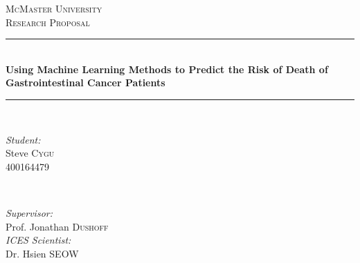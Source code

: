 \begin{titlepage}

\newcommand{\HRule}{\rule{\linewidth}{0.5mm}} %

\center %


\textsc{\LARGE McMaster University}\\[1.5cm] %
\textsc{\Large Research Proposal}\\[0.5cm] %


\HRule \\[0.4cm]
{ \Huge \bfseries Using Machine Learning Methods to Predict the Risk of Death of Gastrointestinal Cancer Patients}\\[0.4cm] %
\HRule \\[1.5cm]


\begin{minipage}{0.4\textwidth}
\begin{flushleft} \large
\emph{Student:}\\
Steve \textsc{Cygu}\\
400164479 %
\end{flushleft}
\end{minipage}
~
\begin{minipage}{0.4\textwidth}
\begin{flushright} \large
\emph{Supervisor:} \\
Prof. Jonathan \textsc{Dushoff}\\[0.1cm]%
\emph{ICES Scientist:}\\
Dr. Hsien \textsc{SEOW}
\end{flushright}
\end{minipage}\\[2cm]


\end{titlepage}

